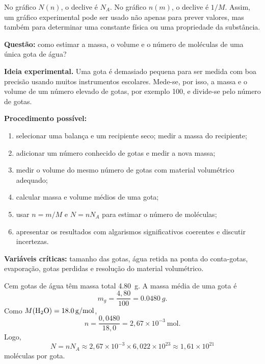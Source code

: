\documentclass[11pt,a4paper,oneside]{book}
\begin{document}
\begin{leituragrafico}
No gráfico $N(n)$, o declive é $N_A$. No gráfico $n(m)$, o declive é $1/M$. Assim, um gráfico experimental pode ser usado não apenas para prever valores, mas também para determinar uma constante física ou uma propriedade da substância.
\end{leituragrafico}

\begin{atividade}[title=AL 1.1 -- Volume e número de moléculas de uma gota de água]
\textbf{Questão:} como estimar a massa, o volume e o número de moléculas de uma única gota de água?

\textbf{Ideia experimental.} Uma gota é demasiado pequena para ser medida com boa precisão usando muitos instrumentos escolares. Mede-se, por isso, a massa e o volume de um número elevado de gotas, por exemplo 100, e divide-se pelo número de gotas.

\textbf{Procedimento possível:}
\begin{enumerate}
  \item selecionar uma balança e um recipiente seco; medir a massa do recipiente;
  \item adicionar um número conhecido de gotas e medir a nova massa;
  \item medir o volume do mesmo número de gotas com material volumétrico adequado;
  \item calcular massa e volume médios de uma gota;
  \item usar $n=m/M$ e $N=nN_A$ para estimar o número de moléculas;
  \item apresentar os resultados com algarismos significativos coerentes e discutir incertezas.
\end{enumerate}

\textbf{Variáveis críticas:} tamanho das gotas, água retida na ponta do conta-gotas, evaporação, gotas perdidas e resolução do material volumétrico.
\end{atividade}

\begin{exemplo}[title=Exemplo resolvido -- moléculas numa gota]
Cem gotas de água têm massa total \SI{4.80}{g}. A massa média de uma gota é
\[
m_g=\frac{4{,}80}{100}=\SI{0.0480}{g}.
\]
Como $M(\ce{H2O})=\SI{18.0}{g/mol}$,
\[
n=\frac{0{,}0480}{18{,}0}=2{,}67\times10^{-3}\ \mathrm{mol}.
\]
Logo,
\[
N=nN_A\approx2{,}67\times10^{-3}\times6{,}022\times10^{23}
  \approx1{,}61\times10^{21}
\]
moléculas por gota.
\end{exemplo}
\end{document}
